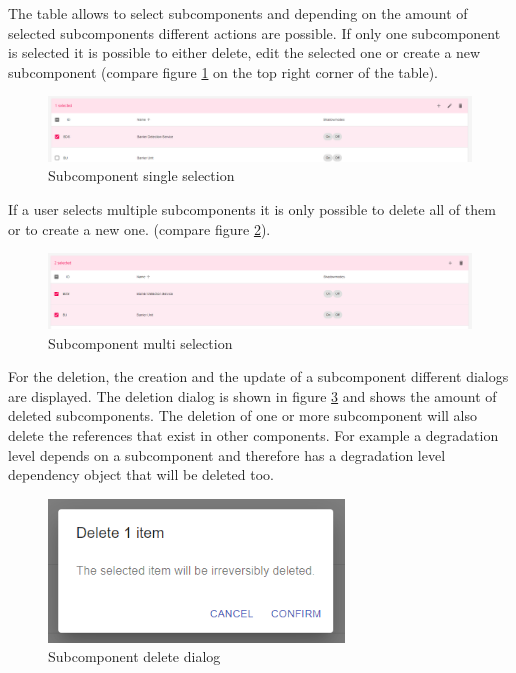 The table allows to select subcomponents and depending on the amount of selected subcomponents different actions are possible. If only one subcomponent is selected it is possible to either delete, edit the selected one or create a new subcomponent (compare figure \ref{fig:subcomponent_view_single} on the top right corner of the table).

\begin{figure}[ht]
    \centering
    \includegraphics[width=\textwidth]{img/subcomponents_single_select.png}
    \caption{Subcomponent single selection}
    \label{fig:subcomponent_view_single}
\end{figure}

If a user selects multiple subcomponents it is only possible to delete all of them or to create a new one. (compare figure \ref{fig:subcomponent_view_multi}).

\begin{figure}[ht]
    \centering
    \includegraphics[width=\textwidth]{img/subcomponents_multi_select.png}
    \caption{Subcomponent multi selection}
    \label{fig:subcomponent_view_multi}
\end{figure}

For the deletion, the creation and the update of a subcomponent different dialogs are displayed.
The deletion dialog is shown in figure \ref{fig:subcomponent_delete_dialog} and shows the amount of deleted subcomponents. The deletion of one or more subcomponent will also delete the references that exist in other components. For example a degradation level depends on a subcomponent and therefore has a degradation level dependency object that will be deleted too.

\begin{figure}[ht]
    \centering
    \includegraphics[width=0.7\textwidth]{img/subcomponents_delete.png}
    \caption{Subcomponent delete dialog}
    \label{fig:subcomponent_delete_dialog}
\end{figure}

